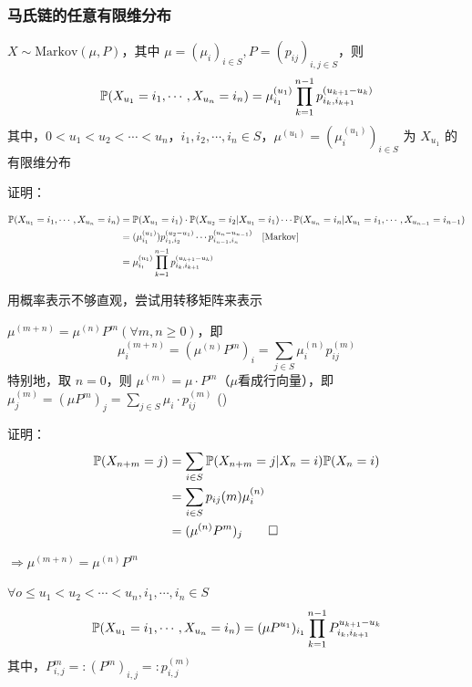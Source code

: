\subsubsection{马氏链的任意有限维分布}

\begin{proposition}
    $X\sim\text{Markov}(\mu, P)$，其中 $\mu=(\mu_i)_{i\in S}, P=(p_{ij})_{i,j\in S}$，则
    \[
    \mathbb{P}(X_{u_1}=i_1,\cdots,X_{u_n}=i_n)=\mu_{i_1}^{(u_1)}\prod_{k=1}^{n-1}p_{i_k,i_{k+1}}^{(u_{k+1}-u_k)}
    \]
    其中，$0<u_1<u_2<\cdots<u_n$，$i_1,i_2,\cdots,i_n\in S$，$\mu^{(u_1)}=(\mu_i^{(u_1)})_{i\in S}$ 为 $X_{u_1}$ 的有限维分布
\end{proposition}

证明：

\[
\begin{aligned}
    \mathbb{P}(X_{u_1}=i_1,\cdots,X_{u_n}=i_n)&=\mathbb{P}(X_{u_1}=i_1)\cdot \mathbb{P}(X_{u_2}=i_2|X_{u_1}=i_1)\cdots \mathbb{P}(X_{u_n}=i_n|X_{u_1}=i_1,\cdots,X_{u_{n-1}}=i_{n-1})\\
    &=(\mu_{i_1}^{(u_1)})p_{i_1,i_2}^{(u_2-u_1)}\cdots p_{i_{n-1},i_n}^{(u_n-u_{n-1})}\quad [\text{Markov}]\\
    &=\mu_{i_1}^{(u_1)}\prod_{k=1}^{n-1}p_{i_k,i_{k+1}}^{(u_{k+1}-u_k)}
\end{aligned}
\]

用概率表示不够直观，尝试用转移矩阵来表示

\begin{lemma}
   $\mu^{(m+n)}=\mu^{(n)}P^m(\forall m,n\geq 0)$，即
   \[
   \mu_i^{(m+n)}=(\mu^{(n)}P^m)_i=\sum_{j\in S}\mu_i^{(n)}p_{ij}^{(m)}
   \]
   特别地，取 $n=0$，则 $\mu^{(m)}=\mu\cdot P^m$（$\mu$看成行向量），即 $\mu_j^{(m)}=(\mu P^m)_j=\sum_{j\in S}\mu_i\cdot p_{ij}^{(m)}$ ()
\end{lemma}

证明：
\[
\begin{aligned}
    \mathbb{P}(X_{n+m}=j)&=\sum_{i\in S}\mathbb{P}(X_{n+m}=j|X_n=i)\mathbb{P}(X_n=i)\\
    &=\sum_{i\in S}p_{ij}(m)\mu_i^{(n)}\\
    &=(\mu^{(n)}P^m)_j\qed
\end{aligned}
\]

$\Rightarrow \mu^{(m+n)}=\mu^{(n)}P^m$

\begin{theorem}[任意有限维分布II]
    $\forall o\leq u_1<u_2<\cdots<u_n, i_1,\cdots,i_n\in S$
    \[
    \mathbb{P}(X_{u_1}=i_1,\cdots,X_{u_n}=i_n)=(\mu P^{u_1})_{i_1}\prod_{k=1}^{n-1}P_{i_k,i_{k+1}}^{u_{k+1}-u_k}
    \]
    其中，$P_{i,j}^m=:(P^m)_{i,j}=:p_{i,j}^{(m)}$
\end{theorem}

